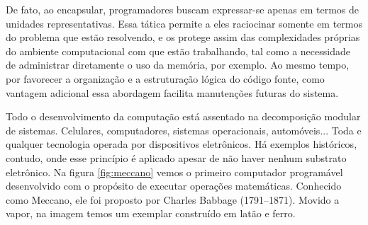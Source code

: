 


De fato, ao encapsular, programadores buscam expressar-se apenas em termos de unidades representativas. Essa tática permite a eles raciocinar somente em termos do problema que estão resolvendo, e os protege assim das complexidades próprias do ambiente computacional com que estão trabalhando, tal como a necessidade de administrar diretamente o uso da memória, por exemplo. Ao mesmo tempo, por favorecer a organização e a estruturação lógica do código fonte, como vantagem adicional essa abordagem facilita manutenções futuras do sistema. 

Todo o desenvolvimento da computação está assentado na decomposição modular de sistemas. Celulares, computadores, sistemas operacionais, automóveis... Toda e qualquer tecnologia operada por dispositivos eletrônicos. Há exemplos históricos, contudo, onde esse princípio é aplicado apesar de não haver nenhum substrato eletrônico. Na figura \ref{fig:meccano} vemos o primeiro computador programável desenvolvido com o propósito de executar operações matemáticas. Conhecido como Meccano, ele foi proposto por Charles Babbage (1791--1871). Movido a vapor, na imagem temos um exemplar construído em latão e ferro.

